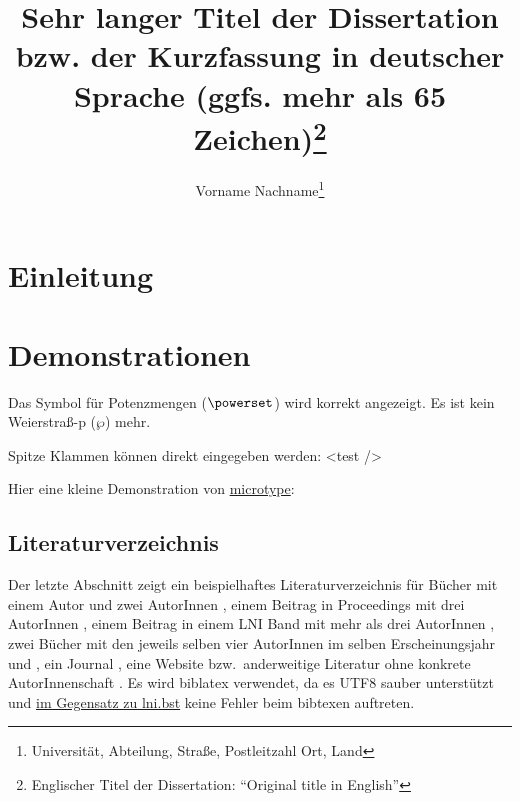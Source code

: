 \documentclass[draft,utf8,biblatex,norunningheads]{lni}
\title[Kurztitel (optional, max. 65 Zeichen)]{Sehr langer Titel der Dissertation bzw. der Kurzfassung in
  deutscher Sprache (ggfs. mehr als 65 Zeichen)\footnote{\todo[inlinewidth=.98\linewidth]{Wenn die Dissertation auf Englisch
      verfasst wurde, Originaltitel anführen!}Englischer Titel der Dissertation: ``Original title in English''}}
\author[Vorname Nachname]
{Vorname Nachname\footnote{Universität, Abteilung, Straße,
    Postleitzahl Ort, Land \email{emailaddress@author1}}}
\begin{document}
\maketitle



\begin{abstract}
   \blindtext
\end{abstract}

\section{Einleitung}

\blindtext

\section{Demonstrationen}
\label{sec:demos}
Das Symbol für Potenzmengen ($\powerset$) wird korrekt angezeigt.
Es ist kein Weierstraß-p ($\wp$) mehr.

Spitze Klammen können direkt eingegeben werden: <test />

Hier eine kleine Demonstration von \href{https://www.ctan.org/pkg/microtype}{microtype}:
\blindtext

\subsection{Literaturverzeichnis}


Der letzte Abschnitt zeigt ein beispielhaftes Literaturverzeichnis für Bücher mit einem Autor \cite{Ez10} und zwei AutorInnen \cite{AB00}, einem Beitrag in Proceedings mit drei AutorInnen \cite{ABC01}, einem Beitrag in einem LNI Band mit mehr als drei AutorInnen \cite{Az09}, zwei Bücher mit den jeweils selben vier AutorInnen im selben Erscheinungsjahr \cite{Wa14} und \cite{Wa14b}, ein Journal \cite{Gl06}, eine Website \cite{GI19} bzw.\ anderweitige Literatur ohne konkrete AutorInnenschaft \cite{XX14}.
Es wird biblatex verwendet, da es UTF8 sauber unterstützt und \href{https://github.com/gi-ev/LNI/issues/5}{im Gegensatz zu lni.bst} keine Fehler beim bibtexen auftreten.
\end{document}
